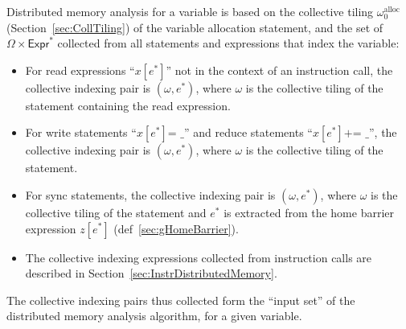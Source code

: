 
Distributed memory analysis for a variable is based on the collective tiling $\omega_0^\text{alloc}$ (Section~\ref{sec:CollTiling}) of the variable allocation statement, and the set of  $\Omega \times \mathsf{Expr}^*$ collected from all statements and expressions that index the variable:
\begin{itemize}
  \item For read expressions ``$x[e^*]$'' not in the context of an instruction call, the collective indexing pair is $(\omega, e^*)$, where $\omega$ is the collective tiling of the statement containing the read expression.
  \item For write statements ``$x[e^*] \texttt{= \_}$'' and reduce statements ``$x[e^*] \texttt{+= \_}$'', the collective indexing pair is $(\omega, e^*)$, where $\omega$ is the collective tiling of the statement.
  \item For sync statements, the collective indexing pair is $(\omega, e^*)$, where $\omega$ is the collective tiling of the statement and $e^*$ is extracted from the home barrier expression $z[e^*]$ (def~\ref{sec:gHomeBarrier}).
  \item The collective indexing expressions collected from instruction calls are described in Section~\ref{sec:InstrDistributedMemory}.
\end{itemize}

The collective indexing pairs thus collected form the ``input set'' of the distributed memory analysis algorithm, for a given variable.

